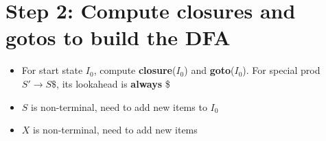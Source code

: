\section*{Step 2: Compute closures and gotos to build the DFA}
\begin{itemize}
\item For start state $I_0$, compute \textbf{closure}($I_0$) and \textbf{goto}($I_0$). For special prod $S'\to S\$$, its lookahead is \textbf{always} \$
\begin{minipage}{\linewidth}
  \centering
\end{minipage}
\item $S$ is non-terminal, need to add new items to $I_0$


\end{itemize}
\begin{minipage}{\linewidth}
\end{minipage}
\begin{itemize}
\item $X$ is non-terminal, need to add new items
\end{itemize}
